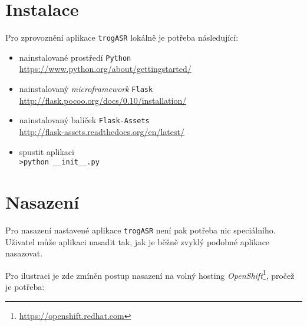\section{Instalace}

Pro zprovoznění aplikace \verb|trogASR| lokálně je potřeba následující:

\begin{itemize}
\item nainstalované prostředí \verb|Python| \\ \url{https://www.python.org/about/gettingstarted/}
\item nainstalovaný {\sl microframework} \verb|Flask| \\ \url{http://flask.pocoo.org/docs/0.10/installation/}
\item nainstalovaný balíček \verb|Flask-Assets| \\ \url{http://flask-assets.readthedocs.org/en/latest/}
\item spustit aplikaci \\ \verb|>python __init__.py|
\end{itemize}

\section{Nasazení}

Pro nasazení nastavené aplikace \verb|trogASR| není pak potřeba nic speciálního. Uživatel může aplikaci nasadit tak, jak je běžně zvyklý podobné aplikace nasazovat.

Pro ilustraci je zde zmíněn postup nasazení na volný hosting {\sl OpenShift}\footnote{\url{https://openshift.redhat.com}}, pročež je potřeba:

